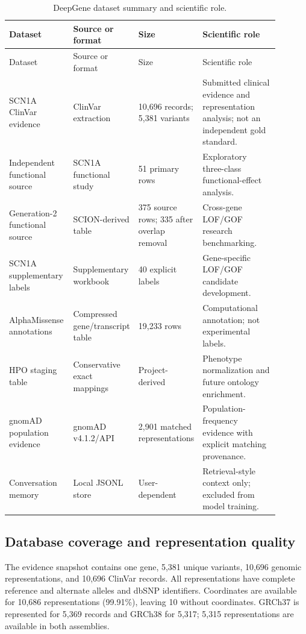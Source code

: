 \documentclass[12pt,a4paper]{article}
\begin{document}
\begin{longtable}{p{0.24\linewidth}p{0.18\linewidth}p{0.16\linewidth}p{0.31\linewidth}}
\caption{DeepGene dataset summary and scientific role.}\label{tab:datasetsummary}\\
\toprule
Dataset & Source or format & Size & Scientific role\\
\midrule
\endfirsthead
\toprule
Dataset & Source or format & Size & Scientific role\\
\midrule
\endhead
SCN1A ClinVar evidence & ClinVar extraction & 10,696 records; 5,381 variants & Submitted clinical evidence and representation analysis; not an independent gold standard.\\
Independent functional source & SCN1A functional study & 51 primary rows & Exploratory three-class functional-effect analysis.\\
Generation-2 functional source & SCION-derived table & 375 source rows; 335 after overlap removal & Cross-gene LOF/GOF research benchmarking.\\
SCN1A supplementary labels & Supplementary workbook & 40 explicit labels & Gene-specific LOF/GOF candidate development.\\
AlphaMissense annotations & Compressed gene/transcript table & 19,233 rows & Computational annotation; not experimental labels.\\
HPO staging table & Conservative exact mappings & Project-derived & Phenotype normalization and future ontology enrichment.\\
gnomAD population evidence & gnomAD v4.1.2/API & 2,901 matched representations & Population-frequency evidence with explicit matching provenance.\\
Conversation memory & Local JSONL store & User-dependent & Retrieval-style context only; excluded from model training.\\
\bottomrule
\end{longtable}

\subsection{Database coverage and representation quality}
The evidence snapshot contains one gene, 5,381 unique variants, 10,696 genomic representations, and 10,696 ClinVar records. All representations have complete reference and alternate alleles and dbSNP identifiers. Coordinates are available for 10,686 representations (99.91\%), leaving 10 without coordinates. GRCh37 is represented for 5,369 records and GRCh38 for 5,317; 5,315 representations are available in both assemblies.
\end{document}
